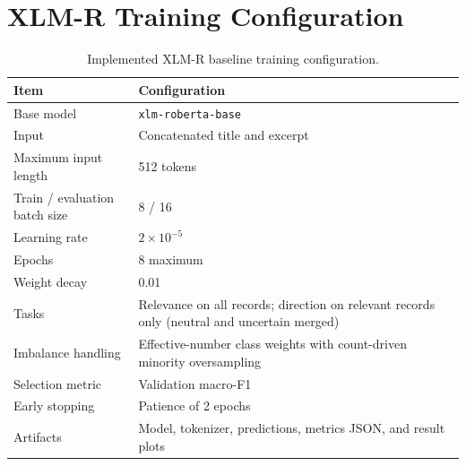 \documentclass[12pt,a4paper]{report}
\begin{document}
\section{XLM-R Training Configuration}
\begin{table}[H]
\centering
\caption{Implemented XLM-R baseline training configuration.}
\label{tab:xlmr-training-config}
\small
\begin{tabularx}{\textwidth}{@{}L{0.32\textwidth}Y@{}}
\toprule
Item & Configuration \\
\midrule
Base model & \texttt{xlm-roberta-base} \\
Input & Concatenated title and excerpt \\
Maximum input length & 512 tokens \\
Train / evaluation batch size & 8 / 16 \\
Learning rate & \(2 \times 10^{-5}\) \\
Epochs & 8 maximum \\
Weight decay & 0.01 \\
Tasks & Relevance on all records; direction on relevant records only (neutral and uncertain merged) \\
Imbalance handling & Effective-number class weights with count-driven minority oversampling \\
Selection metric & Validation macro-F1 \\
Early stopping & Patience of 2 epochs \\
Artifacts & Model, tokenizer, predictions, metrics JSON, and result plots \\
\bottomrule
\end{tabularx}
\end{table}
\end{document}
